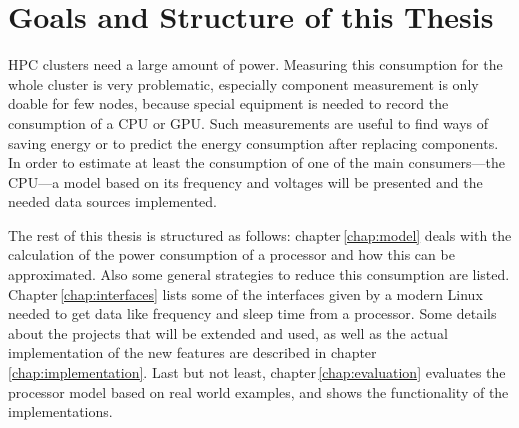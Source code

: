 %
%
\section{Goals and Structure of this Thesis}
HPC clusters need a large amount of power. Measuring this consumption for the whole cluster is very problematic, especially component measurement is only doable for few nodes, because special equipment is needed to record the consumption of a CPU or GPU. Such measurements are useful to find ways of saving energy or to predict the energy consumption after replacing components. In order to estimate at least the consumption of one of the main consumers---the CPU---a model based on its frequency and voltages will be presented and the needed data sources implemented.

\superpar
The rest of this thesis is structured as follows: 
chapter\,\ref{chap:model} deals with the calculation of the power consumption of a processor and how this can be approximated. Also some general strategies to reduce this consumption are listed.
Chapter\,\ref{chap:interfaces} lists some of the interfaces given by a modern Linux needed to get data like frequency and sleep time from a processor.
Some details about the projects that will be extended and used, as well as the actual implementation of the new features are described in chapter\,\ref{chap:implementation}.
Last but not least, chapter\,\ref{chap:evaluation} evaluates the processor model based on real world examples, and shows the functionality of the implementations.